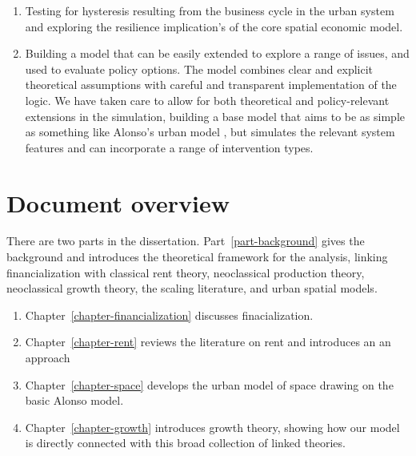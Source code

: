 \begin{enumerate}
    \item Testing for \gls{hysteresis} resulting from the business cycle in the urban system and exploring the \gls{resilience} implication's of the core spatial economic model.

    \item Building a model that can be easily extended to explore a range of issues, and used to evaluate policy options. The model combines clear and explicit theoretical assumptions with careful and transparent implementation of the logic. We have taken care to allow for both theoretical and policy-relevant extensions in the simulation,  building a base model that aims to be as simple as something like Alonso's urban model \cite{alonsoLocationLandUse1964}, but simulates the relevant system features and can incorporate a range of intervention types. 
\end{enumerate}


\section{Document overview}
There are two parts in the dissertation. Part~\ref{part-background} gives the background and introduces the theoretical framework for the analysis, linking financialization with classical rent theory, neoclassical production theory, neoclassical growth theory, the scaling literature, and urban spatial models. 

\begin{enumerate}
    \item Chapter~\ref{chapter-financialization} discusses finacialization.

    \item Chapter~\ref{chapter-rent} reviews the literature on rent and introduces an an approach %

    \item Chapter~\ref{chapter-space} develops the urban model of space drawing on the basic Alonso model.

    \item Chapter~\ref{chapter-growth} introduces growth theory, showing how our model is directly connected with this broad collection of linked theories. 

\end{enumerate}
 
